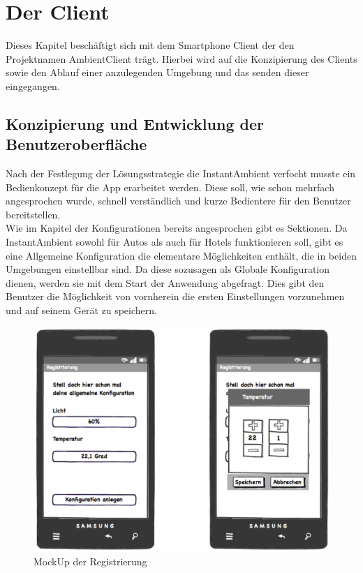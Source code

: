 \chapter{Der Client}
Dieses Kapitel beschäftigt sich mit dem Smartphone Client der den Projektnamen AmbientClient trägt. Hierbei wird auf die Konzipierung des Clients sowie den Ablauf einer anzulegenden Umgebung und das senden dieser eingegangen. 

\section{Konzipierung und Entwicklung der Benutzeroberfläche}
Nach der Festlegung der Lösungsstrategie die InstantAmbient verfocht musste ein Bedienkonzept für die App erarbeitet werden. Diese soll, wie schon mehrfach angesprochen wurde, schnell verständlich und kurze Bedientere für den Benutzer bereitstellen. \\ 
Wie im Kapitel der Konfigurationen bereits angesprochen gibt es Sektionen. Da InstantAmbient sowohl für Autos als auch für Hotels funktionieren soll, gibt es eine Allgemeine Konfiguration die elementare Möglichkeiten enthält, die in beiden Umgebungen einstellbar sind. Da diese sozusagen als Globale Konfiguration dienen, werden sie mit dem Start der Anwendung abgefragt. Dies gibt den Benutzer die Möglichkeit von vornherein die ersten Einstellungen vorzunehmen und auf seinem Gerät zu speichern.  

\begin{figure}[H]
\includegraphics[width=12.5cm]{MockUps/Registrierung}
\caption{MockUp der Registrierung}
\end{figure}

